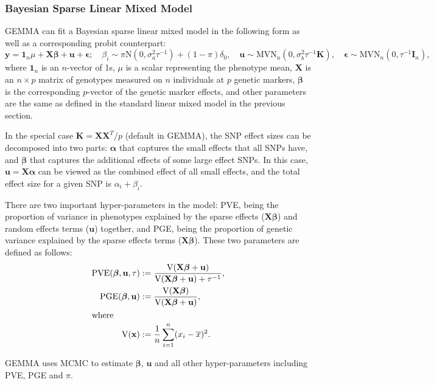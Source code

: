 \documentclass[11pt]{article}
\newcommand{\bu}{\mathbf{u}}
\newcommand{\bK}{\mathbf{K}}
\newcommand{\bX}{\mathbf{X}}
\newcommand{\bI}{\mathbf{I}}
\newcommand{\bepsilon}{\boldsymbol\epsilon}
\newcommand{\bbeta}{\boldsymbol\beta}
\newcommand{\balpha}{\boldsymbol\alpha}
\begin{document}
\subsubsection{Bayesian Sparse Linear Mixed Model}

GEMMA can fit a Bayesian sparse linear mixed model in the following
form as well as a corresponding probit counterpart:
%
\begin{equation*}
\mathbf y=\mathbf 1_n\mu+\bX\bbeta+\bu+\bepsilon;
\quad \beta_i \sim \pi \mbox{N}(0, \sigma_a^2\tau^{-1})+(1-\pi)\delta_0,
\quad \bu\sim \mbox{MVN}_n(0, \sigma_b^2 \tau^{-1} \bK), \quad
\bepsilon \sim \mbox{MVN}_n(0, \tau^{-1} \bI_n),
\end{equation*}
%
where $\mathbf 1_n$ is an $n$-vector of 1s, $\mu$ is a scalar
representing the phenotype mean, $\mathbf X$ is an $n \times p$ matrix
of genotypes measured on $n$ individuals at $p$ genetic markers,
$\bbeta$ is the corresponding $p$-vector of the genetic marker
effects, and other parameters are the same as defined in the standard
linear mixed model in the previous section.

In the special case $\bK=\bX\bX^T/p$ (default in GEMMA), the SNP
effect sizes can be decomposed into two parts: $\balpha$ that captures
the small effects that all SNPs have, and $\bbeta$ that captures the
additional effects of some large effect SNPs. In this case,
$\bu=\bX\balpha$ can be viewed as the combined effect of all small
effects, and the total effect size for a given SNP is
$\alpha_i+\beta_i$.

There are two important hyper-parameters in the model: PVE, being the
proportion of variance in phenotypes explained by the sparse effects
($\bX\bbeta$) and random effects terms ($\bu$) together, and PGE,
being the proportion of genetic variance explained by the sparse
effects terms ($\mathbf X\boldsymbol\beta$). These two parameters are
defined as follows:
\begin{align*}
\mbox{PVE}(\bbeta, \bu, \tau) &
  :=\frac{\mbox{V}(\bX\bbeta+\bu)}{\mbox{V}(\bX\bbeta+\bu)+\tau^{-1}}, \\
\mbox{PGE}(\bbeta, \bu)
  & :=\frac{\mbox{V}(\bX\bbeta)}{\mbox{V}(\bX\bbeta+\bu)}, \\
\intertext{where}
\mbox{V}({\bf x}) &:=\frac{1}{n}\sum_{i=1}^n (x_i-\overline {x})^2.
\end{align*}

GEMMA uses MCMC to estimate $\boldsymbol\beta$, $\mathbf u$ and all
other hyper-parameters including PVE, PGE and $\pi$.
\end{document}
